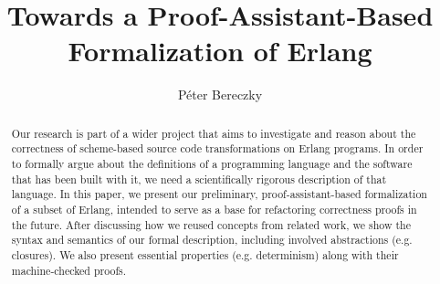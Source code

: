 \documentclass[12pt]{article}
\title{Towards a Proof-Assistant-Based Formalization of Erlang}
\author[1]{Péter Bereczky}
\affil[1]{Faculty of Informatics, Eötvös Loránd University, Hungary}
\theoremstyle{definition}
\numberwithin{equation}{section}
\begin{document}
\maketitle

\begin{abstract}
	
	
	
	 Our research is part of a wider project that aims to investigate and reason about the correctness of scheme-based source code transformations on Erlang programs. In order to formally argue about the definitions of a programming language and the software that has been built with it, we need a scientifically rigorous description of that language. In this paper, we present our preliminary, proof-assistant-based formalization of a subset of Erlang, intended to serve as a base for refactoring correctness proofs in the future. After discussing how we reused concepts from related work, we show the syntax and semantics of our formal description, including involved abstractions (e.g. closures). We also present essential properties (e.g. determinism) along with their machine-checked proofs.
	
\end{abstract}
\newpage
\tableofcontents
\newpage
\end{document}
